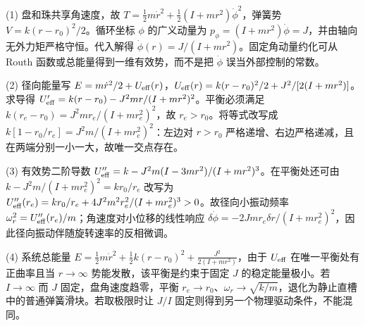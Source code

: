 (1) 盘和珠共享角速度，故 \(T=\frac12m\dot r^2+\frac12(I+mr^2)\dot\phi^2\)，弹簧势 \(V=k(r-r_0)^2/2\)。循环坐标 \(\phi\) 的广义动量为 \(p_\phi=(I+mr^2)\dot\phi=J\)，并由轴向无外力矩严格守恒。代入解得 \(\dot\phi(r)=J/(I+mr^2)\)。固定角动量约化可从 Routh 函数或总能量得到一维有效势，而不是把 \(\dot\phi\) 误当外部控制的常数。

(2) 径向能量写 \(E=m\dot r^2/2+U_{\rm eff}(r)\)，\(U_{\rm eff}(r)=k(r-r_0)^2/2+J^2/[2(I+mr^2)]\)。求导得 \(U'_{\rm eff}=k(r-r_0)-J^2mr/(I+mr^2)^2\)。平衡必须满足 \(k(r_e-r_0)=J^2mr_e/(I+mr_e^2)^2\)，故 \(r_e>r_0\)。将等式改写成 \(k[1-r_0/r_e]=J^2m/(I+mr_e^2)^2\)：左边对 \(r>r_0\) 严格递增、右边严格递减，且在两端分别一小一大，故唯一交点存在。

(3) 有效势二阶导数 \(U''_{\rm eff}=k-J^2m(I-3mr^2)/(I+mr^2)^3\)。在平衡处还可由 \(k-J^2m/(I+mr_e^2)^2=k r_0/r_e\) 改写为 \(U''_{\rm eff}(r_e)=kr_0/r_e+4J^2m^2r_e^2/(I+mr_e^2)^3>0\)。故径向小振动频率 \(\omega_r^2=U''_{\rm eff}(r_e)/m\)；角速度对小位移的线性响应 \(\delta\dot\phi=-2Jmr_e\delta r/(I+mr_e^2)^2\)，因此径向振动伴随旋转速率的反相微调。

(4) 系统总能量 \(E=\frac12m\dot r^2+\frac12k(r-r_0)^2+\frac{J^2}{2(I+mr^2)}\)，由于 \(U_{\rm eff}\) 在唯一平衡处有正曲率且当 \(r\to\infty\) 势能发散，该平衡是约束于固定 \(J\) 的稳定能量极小。若 \(I\to\infty\) 而 \(J\) 固定，盘角速度趋零，平衡 \(r_e\to r_0\)、\(\omega_r\to\sqrt{k/m}\)，退化为静止直槽中的普通弹簧滑块。若取极限时让 \(J/I\) 固定则得到另一个物理驱动条件，不能混同。
